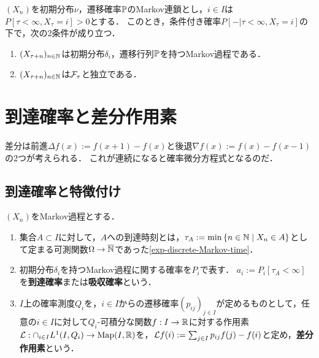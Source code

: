 \documentclass[uplatex,dvipdfmx]{jsreport}
\begin{document}
\begin{theorem}
    $(X_n)$を初期分布$\nu$，遷移確率$\mathbb{P}$のMarkov連鎖とし，$i\in I$は$P[\tau<\infty,X_\tau=i]>0$とする．
    このとき，条件付き確率$P[-|\tau<\infty,X_\tau=i]$の下で，次の2条件が成り立つ．
    \begin{enumerate}
        \item $(X_{\tau+n})_{n\in\mathbb{N}}$は初期分布$\delta_i$，遷移行列$\mathbb{P}$を持つMarkov過程である．
        \item $(X_{\tau+n})_{n\in\mathbb{N}}$は$\mathcal{F}_\tau$と独立である．
    \end{enumerate}
\end{theorem}

\section{到達確率と差分作用素}

\begin{tcolorbox}[colframe=ForestGreen, colback=ForestGreen!10!white,breakable,colbacktitle=ForestGreen!40!white,coltitle=black,fonttitle=\bfseries\sffamily,
title=]
    差分は前進$\Delta f(x):=f(x+1)-f(x)$と後退$\nabla f(x):=f(x)-f(x-1)$の2つが考えられる．
    これが連続になると確率微分方程式となるのだ．
\end{tcolorbox}

\subsection{到達確率と特徴付け}

\begin{definition}
    $(X_n)$をMarkov過程とする．
    \begin{enumerate}
        \item 集合$A\subset I$に対して，$A$への到達時刻とは，$\tau_A:=\min\left\{n\in\mathbb{N}\mid X_n\in A\right\}$として定まる可測関数$\Omega\to\overline{\mathbb{N}}$であった\ref{exp-discrete-Markov-time}．
        \item 初期分布$\delta_i$を持つMarkov過程に関する確率を$P_i$で表す．
        $a_i:=P_i[\tau_A<\infty]$を\textbf{到達確率}または\textbf{吸収確率}という．
        \item $I$上の確率測度$Q_i$を，$i\in I$からの遷移確率$(p_{ij})_{j\in I}$が定めるものとして，任意の$i\in I$に対して$Q_i$-可積分な関数$f:I\to\mathbb{R}$に対する作用素
        $\mathcal{L}:\cap_{i\in I}L^1(I,Q_i)\to\mathrm{Map}(I,\mathbb{R})$を，$\mathcal{L} f(i):=\sum_{j\in I}p_{ij}f(j)-f(i)$と定め，\textbf{差分作用素}という．
    \end{enumerate}
\end{definition}
\end{document}
